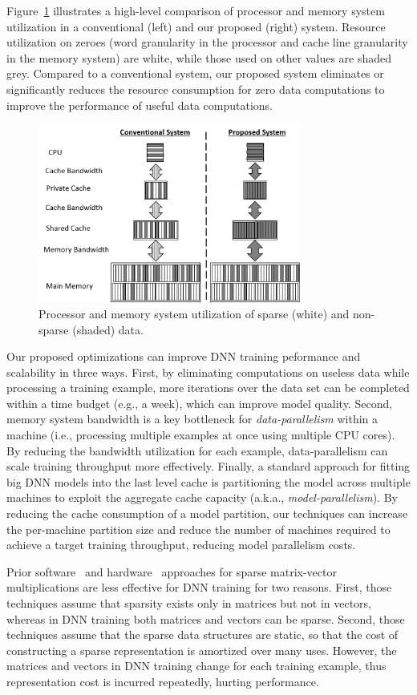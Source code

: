 Figure~\ref{fig:system-compare} illustrates a high-level comparison of processor and memory system utilization in a conventional (left) and our proposed (right) system.  Resource utilization on zeroes (word granularity in the processor and cache line granularity in the memory system) are white, while those used on other values are shaded grey. Compared to a conventional system, our proposed system eliminates or significantly reduces the resource consumption for zero data computations to improve the performance of useful data computations. 

\begin{figure}[!t]
\centering
\includegraphics[width=3.4in]{Figures/system-comparison.png}
\caption{Processor and memory system utilization of sparse (white) and non-sparse (shaded) data.}
\label{fig:system-compare}
\end{figure}

Our proposed optimizations can improve DNN training peformance and scalability in three ways.  First, by eliminating computations on useless data while processing a training example, more iterations over the data set can be completed within a time budget (e.g., a week), which can improve model quality.  Second,  memory system  bandwidth is a key bottleneck for {\it data-parallelism} within a machine (i.e., processing multiple examples at once using multiple CPU cores). By reducing the bandwidth utilization for each example, data-parallelism can scale training throughput more effectively.  Finally, a standard approach for fitting big DNN models into the last level cache is partitioning the model across multiple machines to exploit the aggregate cache capacity (a.k.a., {\it model-parallelism}). By reducing the cache consumption of a model partition, our techniques can increase the per-machine partition size and reduce the number of machines required to achieve a target training throughput, reducing model parallelism costs. 

Prior software~\cite{Eisenstat82, IntelSparseMatrix} and hardware~\cite{Carter99, Srinidhi12, Fowers13} approaches for sparse matrix-vector multiplications are less effective for DNN training for two reasons.  First, those techniques assume that sparsity exists only in matrices but not in vectors, whereas in DNN training both matrices and vectors can be sparse.  Second, those techniques assume that the sparse data structures are static, so that the cost of constructing a sparse representation is amortized over many uses.  However, the matrices and vectors in DNN training change for each training example, thus representation cost is incurred repeatedly, hurting performance. 


